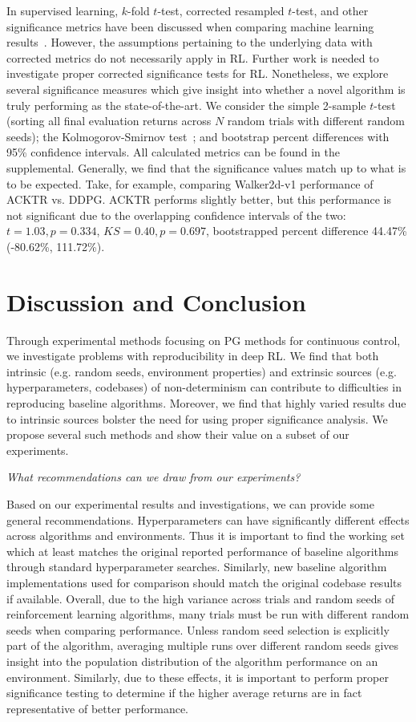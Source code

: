 \documentclass[letterpaper]{article} %
\begin{document}
In supervised learning, $k$-fold $t$-test, corrected resampled $t$-test, and other significance metrics have been discussed when comparing machine learning results~\cite{bouckaert2004evaluating,nadeau2000inference}. However, the assumptions pertaining to the underlying data with corrected metrics do not necessarily apply in RL. Further work is needed to investigate proper corrected significance tests for RL. Nonetheless, we explore several significance measures which give insight into whether a novel algorithm is truly performing as the state-of-the-art. We consider the simple 2-sample $t$-test (sorting all final evaluation returns across $N$ random trials with different random seeds); the Kolmogorov-Smirnov test~\cite{wilcox2005kolmogorov}; and bootstrap percent differences with 95\% confidence intervals. All calculated metrics can be found in the supplemental. Generally, we find that the significance values match up to what is to be expected. Take, for example, comparing Walker2d-v1 performance of ACKTR vs. DDPG. ACKTR performs slightly better, but this performance is not significant due to the overlapping confidence intervals of the two: $t=1.03,p=0.334$, $KS=0.40,p=0.697$, bootstrapped percent difference 44.47\% (-80.62\%, 111.72\%).

\section{Discussion and Conclusion}
\label{sec:discussion}
Through experimental methods focusing on PG methods for continuous control, we investigate problems with reproducibility in deep RL. We find that both intrinsic (e.g. random seeds, environment properties) and extrinsic sources (e.g. hyperparameters, codebases) of non-determinism can contribute to difficulties in reproducing baseline algorithms. Moreover, we find that highly varied results due to intrinsic sources bolster the need for using proper significance analysis. We propose several such methods and show their value on a subset of our experiments.
\medskip

\noindent \textit{What recommendations can we draw from our experiments?}
\medskip

\noindent Based on our experimental results and investigations, we can provide some general recommendations. Hyperparameters can have significantly different effects across algorithms and environments. Thus it is important to find the working set which at least matches the original reported performance of baseline algorithms through standard hyperparameter searches. Similarly, new baseline algorithm implementations used for comparison should match the original codebase results if available. Overall, due to the high variance across trials and random seeds of reinforcement learning algorithms, many trials must be run with different random seeds when comparing performance. Unless random seed selection is explicitly part of the algorithm, averaging multiple runs over different random seeds gives insight into the population distribution of the algorithm performance on an environment. Similarly, due to these effects, it is important to perform proper significance testing to determine if the higher average returns are in fact representative of better performance.
\end{document}

